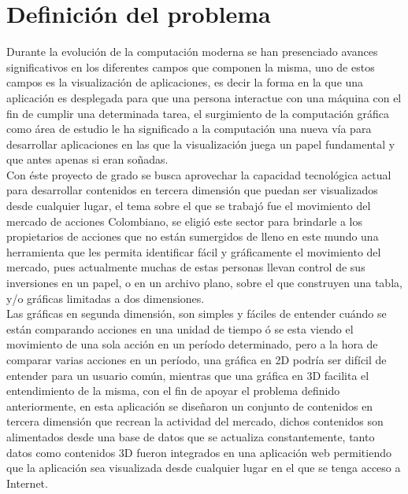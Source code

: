 \chapter{Definición del problema}

Durante la evolución de la computación moderna se han presenciado avances significativos en los diferentes campos que componen la misma, uno de estos campos es la visualización de aplicaciones, es decir la forma en la que una aplicación es desplegada para que una persona interactue con una máquina con el fin de cumplir una determinada tarea, el surgimiento de la computación gráfica como área de estudio le ha significado a la computación una nueva vía para desarrollar aplicaciones en las que la visualización juega un papel fundamental y que antes apenas si eran soñadas.\\

Con éste proyecto de grado se busca aprovechar la capacidad tecnológica actual para desarrollar contenidos en tercera dimensión que puedan ser visualizados desde cualquier lugar, el tema sobre el que se trabajó fue el movimiento del mercado de acciones Colombiano, se eligió este sector para brindarle a los propietarios de acciones que no están sumergidos de lleno en este mundo una herramienta que les permita identificar fácil y gráficamente el movimiento del mercado, pues actualmente muchas de estas personas llevan control de sus inversiones en un papel, o en un archivo plano, sobre el que construyen una tabla, y/o gráficas limitadas a dos dimensiones.\\
	
Las gráficas en segunda dimensión, son simples y fáciles de entender cuándo se están comparando acciones en una unidad de tiempo ó se esta viendo el movimiento de una sola acción en un período determinado, pero a la hora de comparar varias acciones en un período, una gráfica en 2D podría ser difícil de entender para un usuario común, mientras que una gráfica en 3D facilita el entendimiento de la misma, con el fin de apoyar el problema definido anteriormente, en esta aplicación se diseñaron un conjunto de contenidos en tercera dimensión que recrean la actividad del mercado, dichos contenidos son alimentados desde una base de datos que se actualiza constantemente, tanto datos como contenidos 3D fueron integrados en una aplicación web permitiendo que la aplicación sea visualizada desde cualquier lugar en el que se tenga acceso a Internet.\\